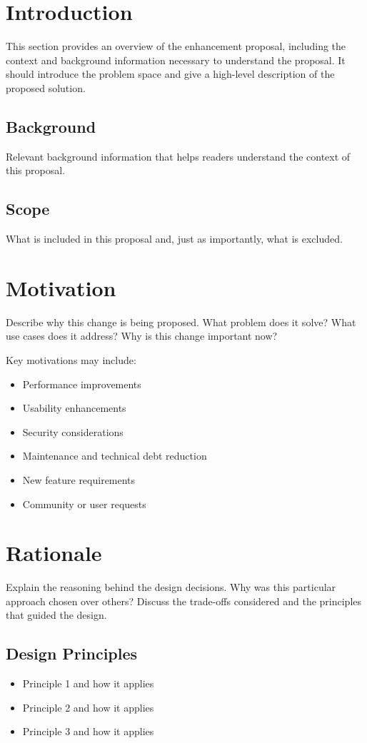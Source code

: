 \documentclass[11pt]{article}
\begin{document}
	\section{Introduction}
	This section provides an overview of the enhancement proposal, including the context and background information necessary to understand the proposal. It should introduce the problem space and give a high-level description of the proposed solution.
	
	\subsection{Background}
	Relevant background information that helps readers understand the context of this proposal.
	
	\subsection{Scope}
	What is included in this proposal and, just as importantly, what is excluded.
	
	\section{Motivation}
	Describe why this change is being proposed. What problem does it solve? What use cases does it address? Why is this change important now?
	
	Key motivations may include:
	\begin{itemize}
		\item Performance improvements
		\item Usability enhancements
		\item Security considerations
		\item Maintenance and technical debt reduction
		\item New feature requirements
		\item Community or user requests
	\end{itemize}
	
	\section{Rationale}
	Explain the reasoning behind the design decisions. Why was this particular approach chosen over others? Discuss the trade-offs considered and the principles that guided the design.
	
	\subsection{Design Principles}
	\begin{itemize}
		\item Principle 1 and how it applies
		\item Principle 2 and how it applies
		\item Principle 3 and how it applies
	\end{itemize}
	
\end{document}
